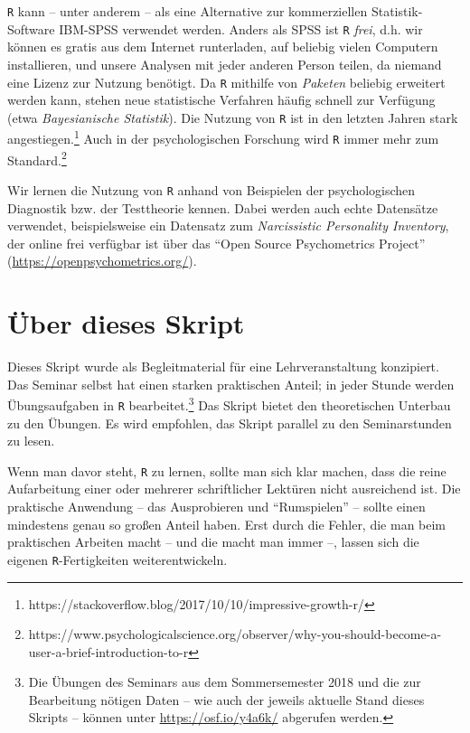 \documentclass[12pt,]{tufte-book}
\theoremstyle{definition}
\theoremstyle{definition}
\theoremstyle{definition}
\theoremstyle{remark}
\begin{document}
\texttt{R} kann -- unter anderem -- als eine Alternative zur
kommerziellen Statistik-Software IBM-SPSS verwendet werden. Anders als
SPSS ist \texttt{R} \emph{frei}, d.h. wir können es gratis aus dem
Internet runterladen, auf beliebig vielen Computern installieren, und
unsere Analysen mit jeder anderen Person teilen, da niemand eine Lizenz
zur Nutzung benötigt. Da \texttt{R} mithilfe von \emph{Paketen} beliebig
erweitert werden kann, stehen neue statistische Verfahren häufig schnell
zur Verfügung (etwa \emph{Bayesianische Statistik}). Die Nutzung von
\texttt{R} ist in den letzten Jahren stark angestiegen.\footnote{https://stackoverflow.blog/2017/10/10/impressive-growth-r/}
Auch in der psychologischen Forschung wird \texttt{R} immer mehr zum
Standard.\footnote{https://www.psychologicalscience.org/observer/why-you-should-become-a-user-a-brief-introduction-to-r}

Wir lernen die Nutzung von \texttt{R} anhand von Beispielen der
psychologischen Diagnostik bzw. der Testtheorie kennen. Dabei werden
auch echte Datensätze verwendet, beispielsweise ein Datensatz zum
\emph{Narcissistic Personality Inventory}, der online frei verfügbar ist
über das ``Open Source Psychometrics Project''
(\url{https://openpsychometrics.org/}).

\section{Über dieses Skript}\label{uxfcber-dieses-skript}

Dieses Skript wurde als Begleitmaterial für eine Lehrveranstaltung
konzipiert. Das Seminar selbst hat einen starken praktischen Anteil; in
jeder Stunde werden Übungsaufgaben in \texttt{R} bearbeitet.\footnote{Die
  Übungen des Seminars aus dem Sommersemester 2018 und die zur
  Bearbeitung nötigen Daten -- wie auch der jeweils aktuelle Stand
  dieses Skripts -- können unter \url{https://osf.io/y4a6k/} abgerufen
  werden.} Das Skript bietet den theoretischen Unterbau zu den Übungen.
Es wird empfohlen, das Skript parallel zu den Seminarstunden zu lesen.

Wenn man davor steht, \texttt{R} zu lernen, sollte man sich klar machen,
dass die reine Aufarbeitung einer oder mehrerer schriftlicher Lektüren
nicht ausreichend ist. Die praktische Anwendung -- das Ausprobieren und
``Rumspielen'' -- sollte einen mindestens genau so großen Anteil haben.
Erst durch die Fehler, die man beim praktischen Arbeiten macht -- und
die macht man immer --, lassen sich die eigenen \texttt{R}-Fertigkeiten
weiterentwickeln.
\end{document}
